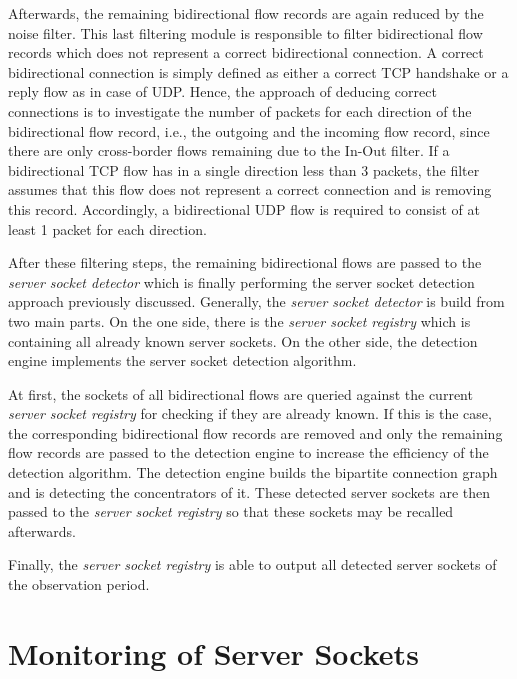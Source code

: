 Afterwards, the remaining bidirectional flow records are again reduced by the noise filter. This last filtering module is responsible to filter bidirectional flow records which does not represent a correct bidirectional connection. A correct bidirectional connection is simply defined as either a correct \gls{TCP} handshake or a reply flow as in case of \gls{UDP}. Hence, the approach of deducing correct connections is to investigate the number of packets for each direction of the bidirectional flow record, i.e., the outgoing and the incoming flow record, since there are only cross-border flows remaining due to the In-Out filter. 
If a bidirectional \gls{TCP} flow has in a single direction less than 3 packets, the filter assumes that this flow does not represent a correct connection and is removing this record. Accordingly, a bidirectional \gls{UDP} flow is required to consist of at least 1 packet for each direction. 

After these filtering steps, the remaining bidirectional flows are passed to the \emph{server socket detector} which is finally performing the \gls{server socket} detection approach previously discussed. 
Generally, the \emph{server socket detector} is build from two main parts. On the one side, there is the \emph{server socket registry} which is containing all already known \glspl{server socket}. 
On the other side, the detection engine implements the \gls{server socket} detection algorithm.

At first, the sockets of all bidirectional flows are queried against the current \emph{server socket registry} for checking if they are already known. 
If this is the case, the corresponding bidirectional flow records are removed and only the remaining flow records are passed to the detection engine to increase the efficiency of the detection algorithm. 
The detection engine builds the bipartite connection graph and is detecting the concentrators of it.
These detected \glspl{server socket} are then passed to the \emph{server socket registry} so that these sockets may be recalled afterwards.

Finally, the \emph{server socket registry} is able to output all detected \glspl{server socket} of the observation period.

\newpage
\section{Monitoring of Server Sockets
\label{section:socket_tracking}}

